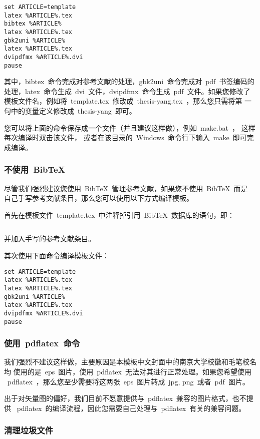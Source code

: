 \documentclass[oneside, phd]{njuthesis}
\begin{document}
\begin{Verbatim}[frame=lines]
set ARTICLE=template
latex %ARTICLE%.tex
bibtex %ARTICLE%
latex %ARTICLE%.tex
gbk2uni %ARTICLE%
latex %ARTICLE%.tex
dvipdfmx %ARTICLE%.dvi
pause
\end{Verbatim}

其中，bibtex~命令完成对参考文献的处理，gbk2uni~命令完成对~pdf~书签编码的
处理，latex~命令生成~dvi~文件，dvipdfmx~命令生成~pdf~文件。如果您修改了
模板文件名，例如将~template.tex~修改成~thesis-yang.tex~，那么您只需将第
一句中的变量定义修改成~thesis-yang~即可。

您可以将上面的命令保存成一个文件（并且建议这样做），例如~make.bat~，
这样每次编译时双击该文件，
或者在该目录的~Windows~命令行下输入~make~即可完成编译。

\subsubsection{不使用~BibTeX}

尽管我们强烈建议您使用~BibTeX~管理参考文献，如果您不使用~BibTeX~而是
自己手写参考文献条目，那么您可以使用以下方式编译模板。

首先在模板文件~template.tex~中注释掉引用~BibTeX~数据库的语句，即：

\begin{Verbatim}[frame=lines]

\end{Verbatim}

\noindent 并加入手写的参考文献条目。

其次使用下面命令编译模板文件：
\begin{Verbatim}[frame=lines]
set ARTICLE=template
latex %ARTICLE%.tex
latex %ARTICLE%.tex
gbk2uni %ARTICLE%
latex %ARTICLE%.tex
dvipdfmx %ARTICLE%.dvi
pause
\end{Verbatim}

\subsubsection{使用~pdflatex~命令}

我们强烈不建议这样做，主要原因是本模板中文封面中的南京大学校徽和毛笔校名均
使用的是~eps~图片，使用~pdflatex~无法对其进行正常处理。如果您希望使用
~pdflatex~，那么您至少需要将这两张~eps~图片转成~jpg, png~或者~pdf~图片。

出于对矢量图的偏好，我们目前不愿意提供与~pdflatex~兼容的图片格式，也不提供
~pdflatex~的编译流程，因此您需要自己处理与~pdflatex~有关的兼容问题。

\subsubsection{清理垃圾文件}
\end{document}
